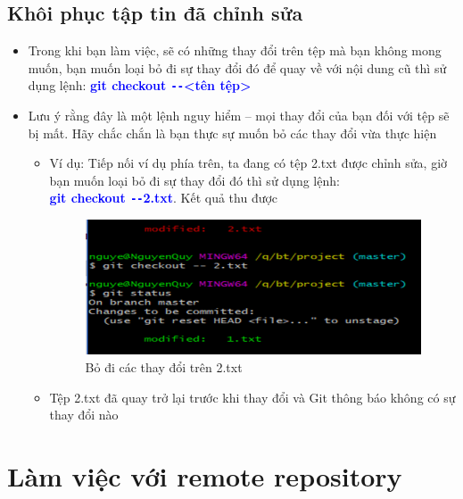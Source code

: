 \documentclass[12pt,a4paper]{report}
\begin{document}
\subsection{Khôi phục tập tin đã chỉnh sửa}
\begin{itemize}
\item Trong khi bạn làm việc, sẽ có những thay đổi trên tệp mà bạn không mong muốn, bạn muốn loại bỏ đi sự thay đổi đó để quay về với nội dung cũ thì sử dụng lệnh: \textcolor{blue}{\bf git checkout \texttt{-{}-}<tên tệp>}
\item Lưu ý rằng đây là một lệnh nguy hiểm – mọi thay đổi của bạn đối với tệp sẽ bị mất. Hãy chắc chắn là bạn thực sự muốn bỏ các thay đổi vừa thực hiện
	\begin{itemize}
\item Ví dụ: Tiếp nối ví dụ phía trên, ta đang có tệp 2.txt được chỉnh sửa, giờ bạn muốn loại bỏ đi sự thay đổi đó thì sử dụng lệnh:\\ \textcolor{blue}{\bf git checkout \texttt{-{}-}2.txt}. Kết quả thu được

\begin{figure}[!ht]
	\centering
	\includegraphics[width=0.8\linewidth]{screenshot031}
\caption{Bỏ đi các thay đổi trên 2.txt}
	\label{fig:screenshot031}
	\end{figure}

\item Tệp 2.txt đã quay trở lại trước khi thay đổi và Git thông báo không có sự thay đổi nào
\end{itemize}\end{itemize}

\section{Làm việc với remote repository}
\end{document}
